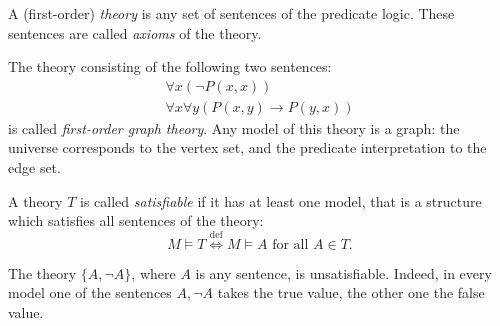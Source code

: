 \begin{page}
\setcounter{section}{3}
\setcounter{subsection}{1}
\setcounter{dfn}{1}
\label{portion:578}

\begin{dfn}
A (first-order) \emph{theory} is any set of sentences of the predicate logic.
These sentences are called \emph{axioms} of the theory.
\end{dfn}

\end{page}

\begin{page}
\setcounter{section}{3}
\setcounter{subsection}{1}
\setcounter{dfn}{2}
\label{portion:581}

\begin{exl}
\label{exl:FirstGraphTheory}
The theory consisting of the following two sentences:
\begin{gather*}
\forall x (\neg P(x,x))\\
\forall x \forall y (P(x,y) \to P(y,x))
\end{gather*}
is called \emph{first-order graph theory}.
Any model of this theory is a graph:
the universe corresponds to the vertex set, and the predicate interpretation to the edge set.

\end{exl}

\end{page}

\begin{page}
\setcounter{section}{3}
\setcounter{subsection}{1}
\setcounter{dfn}{3}
\label{portion:584}

\begin{dfn}
A theory $T$ is called \emph{satisfiable} if it has at least one model,
that is a structure which satisfies all sentences of the theory:
\[
M \vDash T \stackrel{\mathrm{def}}{\Longleftrightarrow} M \vDash A \text{ for all }A \in T.
\]
\end{dfn}

\end{page}

\begin{page}
\setcounter{section}{3}
\setcounter{subsection}{1}
\setcounter{dfn}{4}
\label{portion:587}

\begin{exl}
The theory $\{A, \neg A\}$, where $A$ is any sentence, is unsatisfiable.
Indeed, in every model one of the sentences $A, \neg A$ takes the true value, the other one the false value.
\end{exl}

\end{page}


